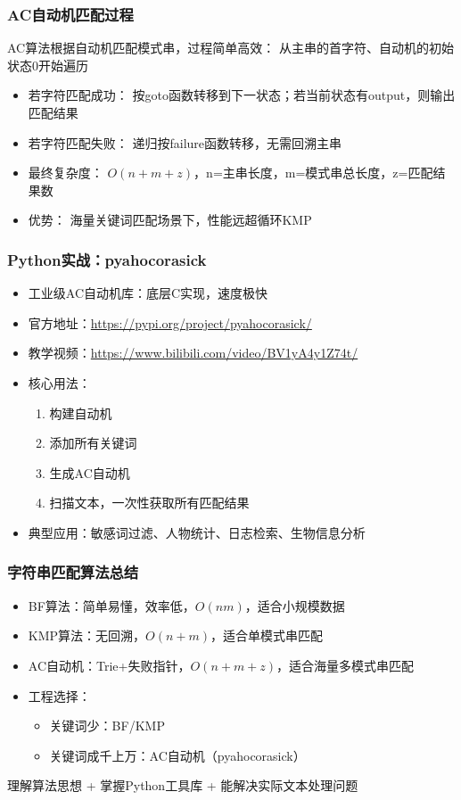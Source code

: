 \begin{frame}[fragile]
  \frametitle{AC自动机匹配过程}
  AC算法根据自动机匹配模式串，过程简单高效：
  从主串的首字符、自动机的初始状态0开始遍历

  \begin{itemize}
  \item 若字符匹配成功：
    按goto函数转移到下一状态；若当前状态有output，则输出匹配结果
  \item 若字符匹配失败：
    递归按failure函数转移，无需回溯主串
  \item 最终复杂度：
    $O(n + m + z)$，n=主串长度，m=模式串总长度，z=匹配结果数
  \item 优势：
    海量关键词匹配场景下，性能远超循环KMP
  \end{itemize}
\end{frame}


\begin{frame}[fragile]
  \frametitle{Python实战：pyahocorasick}
  \begin{itemize}
  \item 工业级AC自动机库：底层C实现，速度极快
  \item 官方地址：\url{https://pypi.org/project/pyahocorasick/}
  \item 教学视频：\url{https://www.bilibili.com/video/BV1yA4y1Z74t/}
  \item 核心用法：
    \begin{enumerate}
    \item 构建自动机
    \item 添加所有关键词
    \item 生成AC自动机
    \item 扫描文本，一次性获取所有匹配结果
    \end{enumerate}
  \item 典型应用：敏感词过滤、人物统计、日志检索、生物信息分析
  \end{itemize}
\end{frame}

\begin{frame}[fragile]
  \frametitle{字符串匹配算法总结}
  \begin{itemize}
  \item BF算法：简单易懂，效率低，$O(nm)$，适合小规模数据
  \item KMP算法：无回溯，$O(n+m)$，适合单模式串匹配
  \item AC自动机：Trie+失败指针，$O(n+m+z)$，适合海量多模式串匹配
  \item 工程选择：
    \begin{itemize}
    \item 关键词少：BF/KMP
    \item 关键词成千上万：AC自动机（pyahocorasick）
    \end{itemize}
  \end{itemize}
  \begin{tcolorbox}[title=学习重点]
  理解算法思想 + 掌握Python工具库 + 能解决实际文本处理问题
  \end{tcolorbox}
\end{frame}
